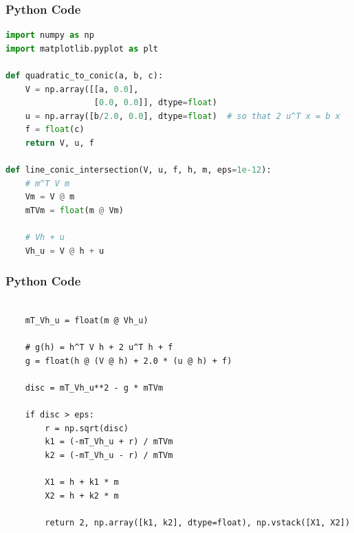 \documentclass{beamer}
\numberwithin{equation}{section}
\begin{document}
\begin{frame}[fragile]
\frametitle{Python Code }
\begin{lstlisting}[language=Python]
import numpy as np
import matplotlib.pyplot as plt

def quadratic_to_conic(a, b, c):
    V = np.array([[a, 0.0],
                  [0.0, 0.0]], dtype=float)
    u = np.array([b/2.0, 0.0], dtype=float)  # so that 2 u^T x = b x
    f = float(c)
    return V, u, f

def line_conic_intersection(V, u, f, h, m, eps=1e-12):
    # m^T V m
    Vm = V @ m
    mTVm = float(m @ Vm)
    
    # Vh + u
    Vh_u = V @ h + u
\end{lstlisting}

\end{frame}
\begin{frame}[fragile]
    \frametitle{Python Code}
    \begin{lstlisting}

    mT_Vh_u = float(m @ Vh_u)
    
    # g(h) = h^T V h + 2 u^T h + f
    g = float(h @ (V @ h) + 2.0 * (u @ h) + f)
    
    disc = mT_Vh_u**2 - g * mTVm
    
    if disc > eps:
        r = np.sqrt(disc)
        k1 = (-mT_Vh_u + r) / mTVm
        k2 = (-mT_Vh_u - r) / mTVm
        
        X1 = h + k1 * m
        X2 = h + k2 * m
        
        return 2, np.array([k1, k2], dtype=float), np.vstack([X1, X2])

\end{lstlisting}
\end{frame}
\end{document}
